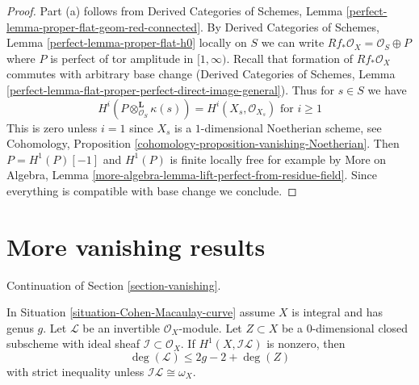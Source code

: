 \begin{proof}
Part (a) follows from
Derived Categories of Schemes, Lemma
\ref{perfect-lemma-proper-flat-geom-red-connected}.
By Derived Categories of Schemes, Lemma
\ref{perfect-lemma-proper-flat-h0} locally on $S$
we can write $Rf_*\mathcal{O}_X = \mathcal{O}_S \oplus P$
where $P$ is perfect of tor amplitude in $[1, \infty)$.
Recall that formation of $Rf_*\mathcal{O}_X$ commutes
with arbitrary base change
(Derived Categories of Schemes, Lemma
\ref{perfect-lemma-flat-proper-perfect-direct-image-general}).
Thus for $s \in S$ we have
$$
H^i(P \otimes_{\mathcal{O}_S}^\mathbf{L} \kappa(s)) =
H^i(X_s, \mathcal{O}_{X_s})
\text{ for }i \geq 1
$$
This is zero unless $i = 1$ since $X_s$ is a $1$-dimensional
Noetherian scheme, see
Cohomology, Proposition \ref{cohomology-proposition-vanishing-Noetherian}.
Then $P = H^1(P)[-1]$ and $H^1(P)$ is finite locally free
for example by More on Algebra, Lemma
\ref{more-algebra-lemma-lift-perfect-from-residue-field}.
Since everything is compatible with base change we conclude.
\end{proof}







\section{More vanishing results}
\label{section-more-vanishing}

\noindent
Continuation of Section \ref{section-vanishing}.

\begin{lemma}
\label{lemma-h1-nonzero-degree-leq-2g-2}
In Situation \ref{situation-Cohen-Macaulay-curve} assume $X$ is integral and
has genus $g$. Let $\mathcal{L}$ be an invertible $\mathcal{O}_X$-module.
Let $Z \subset X$ be a $0$-dimensional closed subscheme with ideal
sheaf $\mathcal{I} \subset \mathcal{O}_X$. If $H^1(X, \mathcal{I}\mathcal{L})$
is nonzero, then
$$
\deg(\mathcal{L}) \leq 2g - 2 + \deg(Z)
$$
with strict inequality unless $\mathcal{I}\mathcal{L} \cong \omega_X$.
\end{lemma}

